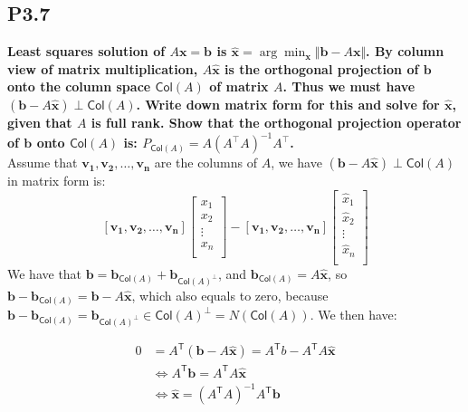 \documentclass[12pt]{article}
\begin{document}
\subsection*{P3.7}
\textbf{Least squares solution of $A\mathbf x = \mathbf b$ is $\hat{\mathbf x}=\arg\min_{\mathbf x}\Vert \mathbf b - A\mathbf x\Vert$. By column view of matrix multiplication, $A\hat{\mathbf x}$ is the orthogonal projection of $\mathbf b$ onto the column space $\mathsf{Col}(A)$ of matrix $A$. Thus we must have $(\mathbf b - A\hat{\mathbf x})\perp\mathsf{Col}(A)$. Write down matrix form for this and solve for $\hat{\mathbf x}$, given that $A$ is full rank. Show that the orthogonal projection operator of $\mathbf b$ onto $\mathsf{Col}(A)$ is: $P_{\mathsf{Col}(A)} = A(A^{\top}A)^{-1}A^{\top}$.}\\
Assume that $\mathbf{v_1,v_2,\ldots,v_n}$ are the columns of $A$, we have $(\mathbf b - A\hat{\mathbf x})\perp\mathsf{Col}(A)$ in matrix form is:
$$[\mathbf{v_1, v_2,\ldots,v_n}]
\begin{bmatrix}
x_1\\
x_2\\
\vdots\\
x_n\\
\end{bmatrix}-
[\mathbf{v_1, v_2,\ldots,v_n}]
\begin{bmatrix}
\hat{x}_1\\
\hat{x}_2\\
\vdots\\
\hat{x}_n\\
\end{bmatrix}$$
We have that $\mathbf{b} = \mathbf{b}_{\mathsf{Col}(A)} + \mathbf{b}_{\mathsf{Col}(A)^\perp}$, and $\mathbf{b}_{\mathsf{Col}(A)} = A\hat{\mathbf{x}}$, so $\mathbf{b}-\mathbf{b}_{\mathsf{Col}(A)} = \mathbf{b}-A\hat{\mathbf{x}}$, which also equals to zero, because $\mathbf{b}-\mathbf{b}_{\mathsf{Col}(A)} =  \mathbf{b}_{\mathsf{Col}(A)^\perp} \in \mathsf{Col}(A)^\perp = N(\mathsf{Col}(A))$. We then have:

\begin{align*}
0 &= A^\mathsf{T}(\mathbf{b}-A\hat{\mathbf{x}}) = A^\mathsf{T}b - A^\mathsf{T}A\hat{\mathbf{x}}\\
&\Leftrightarrow A^\mathsf{T}\mathbf{b} = A^\mathsf{T}A\hat{\mathbf{x}}\\
&\Leftrightarrow \hat{\mathbf{x}} = (A^\mathsf{T}A)^{-1}A^\mathsf{T}\mathbf{b}
\end{align*}

\end{document}
